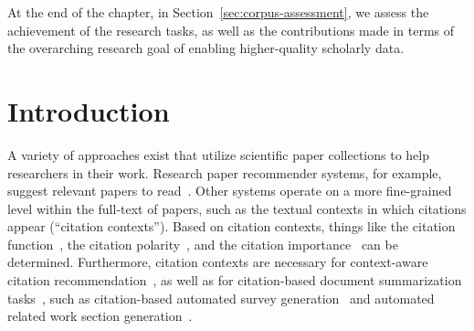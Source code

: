 At the end of the chapter, in Section~\ref{sec:corpus-assessment}, we assess the achievement of the research tasks, as well as the contributions made in terms of the overarching research goal of enabling higher-quality scholarly data.


\section{Introduction}
A variety of approaches exist that utilize scientific paper collections to help researchers in their work. 
Research paper recommender systems, for example, suggest relevant papers to read~\cite{Beel2016fixed}. Other systems operate on a more fine-grained level within the full-text of papers, such as the textual contexts in which citations appear (``citation contexts''). 
Based on citation contexts, things like the citation function~\cite{Teufel2006EMNLP,Teufel2006fixed,Moravcsik1975}, the citation polarity~\cite{GhoshD017,Abujbara2013}, and the citation importance~\cite{Valenzuela2015fixed,Chakraborty2016} can be determined. Furthermore, citation contexts are necessary for context-aware citation recommendation~\cite{He2010WWW,Ebensu2017}, as well as for citation-based document summarization tasks~\cite{Chandrasekaran2019}, such as citation-based automated survey generation~\cite{Mohammad2009} and automated related work section generation~\cite{Jinggiang2007}.

